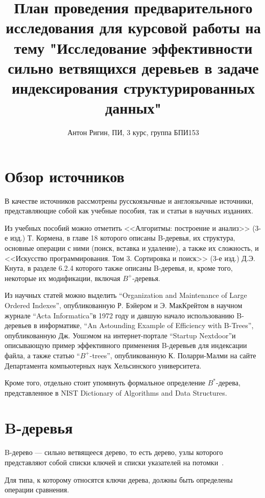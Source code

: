 \documentclass[a4paper,12pt]{article}
\title{План проведения предварительного исследования для курсовой работы на тему "Исследование эффективности сильно ветвящихся деревьев в задаче индексирования структурированных данных"}
\author{Антон Ригин, ПИ, 3 курс, группа БПИ153}
\date{}
\begin{document}
	
	\maketitle
	
	\section{Обзор источников}
	
	В качестве источников рассмотрены русскоязычные и англоязычные источники, представляющие собой как учебные пособия, так и статьи в научных изданиях.
	
	Из учебных пособий можно отметить <<Алгоритмы: построение и анализ>> (3-е изд.) Т. Кормена, в главе 18 которого описаны B-деревья, их структура, основные операции с ними (поиск, вставка и удаление), а также их сложность, и <<Искусство программирования. Том 3. Сортировка и поиск>> (3-е изд.) Д.Э. Кнута, в разделе 6.2.4 которого также описаны B-деревья, и, кроме того, некоторые их модификации, включая $B^+$-деревья.
	
	Из научных статей можно выделить \textquotedblleft Organization and Maintenance of Large Ordered Indexes\textquotedblright, опубликованную Р. Бэйером и Э. МакКрейтом в научном журнале \textquotedblleft Acta Informatica\textquotedblright в 1972 году и давшую начало использованию B-деревьев в информатике, \textquotedblleft An Astounding Example of Efficiency with B-Trees\textquotedblright, опубликованную Дж. Уошэмом на интернет-портале \textquotedblleft Startup Nextdoor\textquotedblright и описывающую пример эффективного применения B-деревьев для индексации файла, а также статью \textquotedblleft$B^+$-trees\textquotedblright, опубликованную К. Поларри-Малми на сайте Департамента компьютерных наук Хельсинского университета.
	
	Кроме того, отдельно стоит упомянуть формальное определение $B^*$-дерева, представленное в NIST Dictionary of Algorithms and Data Structures.
	
	\section{B-деревья}
	
	B-дерево --- сильно ветвящееся дерево, то есть дерево, узлы которого представляют собой списки ключей и списки указателей на потомки~\cite{Kormen}.
	
	Для типа, к которому относятся ключи дерева, должны быть определены операции сравнения.
	
\end{document}
